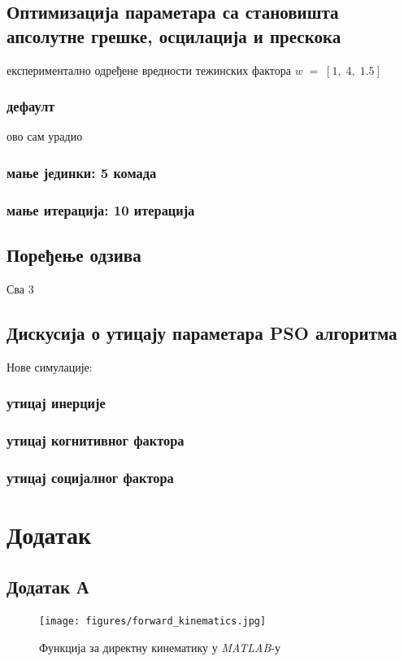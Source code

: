 \documentclass[12pt]{article}
\begin{document}
\subsection{Оптимизација параметара са становишта апсолутне грешке, осцилација и прескока}
експериментално одређене вредности тежинских фактора $w\; =\; [1,\; 4,\; 1.5]$
\subsubsection{дефаулт}
ово сам урадио
\subsubsection{мање јединки: 5 комада}
\subsubsection{мање итерација: 10 итерација}

\subsection{Поређење одзива}
Сва 3

\subsection{Дискусија о утицају параметара PSO алгоритма}
Нове симулације:
\subsubsection{утицај инерције}
\subsubsection{утицај когнитивног фактора}
\subsubsection{утицај социјалног фактора}

\newpage
\section{Додатак}
\subsection{Додатак А}
\begin{figure}[H]
    \centering
    \texttt{[image: figures/forward\_kinematics.jpg]}
    \caption{Функција за директну кинематику у \textit{MATLAB}-у}
    \label{fig:direktna_kinematika_matlab}
\end{figure}
\end{document}
